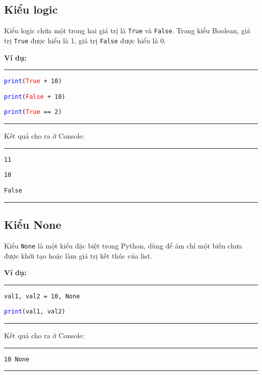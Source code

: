 \subsection{Kiểu logic}
Kiểu logic chứa một trong hai giá trị là \texttt{True} và \texttt{False}. Trong kiểu Boolean, giá trị \texttt{True} được hiểu là 1, giá trị \texttt{False} được hiểu là 0.\par
\textbf{Ví dụ:}\\
\rule{\linewidth}{0.2mm}\par
\begin{linenumbers}
	\texttt{\textcolor{blue}{print}(\textcolor{red}{True} + 10)}\par
	\texttt{\textcolor{blue}{print}(\textcolor{red}{False} + 10)}\par
	\texttt{\textcolor{blue}{print}(\textcolor{red}{True} == 2)}\par
\end{linenumbers}
\rule{\linewidth}{0.2mm}\par
\noindent
\resetlinenumber
Kết quả cho ra ở Console:\\
\rule{\linewidth}{0.2mm}\par
\begin{linenumbers}
	\texttt{11}\par
	\texttt{10}\par
	\texttt{False}\par
\end{linenumbers}
\rule{\linewidth}{0.2mm}\par
\resetlinenumber
\newpage
\subsection{Kiểu None}
Kiểu \texttt{None} là một kiểu đặc biệt trong Python, dùng để ám chỉ một biến chưa được khởi tạo hoặc làm giá trị kết thúc của list.\par
\textbf{Ví dụ:}\\
\rule{\linewidth}{0.2mm}\par
\begin{linenumbers}
	\texttt{val1, val2 = 10, None}\par
	\texttt{\textcolor{blue}{print}(val1, val2)}\par
\end{linenumbers}
\rule{\linewidth}{0.2mm}\par
\noindent
\resetlinenumber
Kết quả cho ra ở Console:\\
\rule{\linewidth}{0.2mm}\par
\begin{linenumbers}
	\texttt{10 None}\par
\end{linenumbers}
\rule{\linewidth}{0.2mm}\par
\resetlinenumber
\newpage
